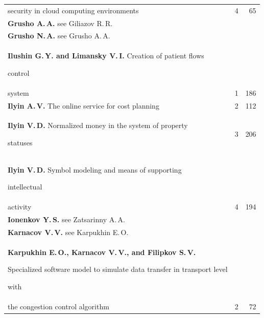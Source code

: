 {\begin{tabular}{p{311pt}rr}
\\[-12pt]


\hspace*{21pt}security in cloud computing environments&4&65\\


\textbf{Grusho A.\,A.} see Giliazov R.\,R.&&\\


\textbf{Grusho N.\,A.} see Grusho A.\,A.&&\\


\textbf{Ilushin G.\,Y. and Limansky V.\,I.} Creation of patient flows


control\linebreak


\\[-12pt]


\hspace*{21pt}system&1&186\\


\textbf{Ilyin A.\,V.} The online service for cost planning&2&112\\


\textbf{Ilyin V.\,D.} Normalized money in the system of property


statuses&3&206\\


\textbf{Ilyin V.\,D.} Symbol modeling and means of supporting


intellectual\linebreak


\\[-12pt]


\hspace*{21pt}activity&4&194\\


\textbf{Ionenkov Y.\,S.} see Zatsarinny A.\,A.&&\\


\textbf{Karnacov V.\,V.} see Karpukhin E.\,O.&&\\


\hangindent=21pt\noindent\textbf{Karpukhin E.\,O., Karnacov V.\,V., and Filipkov S.\,V.}


Specialized software model to simulate data transfer in transport level


with\linebreak


\\[-12pt]


\hspace*{21pt}the congestion control algorithm&2&72\\



\end{tabular}}
